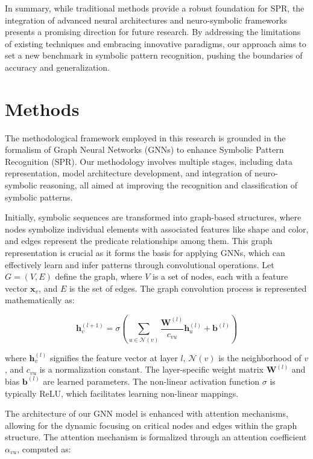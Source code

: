 \documentclass{article}
\begin{document}
In summary, while traditional methods provide a robust foundation for SPR, the integration of advanced neural architectures and neuro-symbolic frameworks presents a promising direction for future research. By addressing the limitations of existing techniques and embracing innovative paradigms, our approach aims to set a new benchmark in symbolic pattern recognition, pushing the boundaries of accuracy and generalization.

\section{Methods}
The methodological framework employed in this research is grounded in the formalism of Graph Neural Networks (GNNs) to enhance Symbolic Pattern Recognition (SPR). Our methodology involves multiple stages, including data representation, model architecture development, and integration of neuro-symbolic reasoning, all aimed at improving the recognition and classification of symbolic patterns. 

Initially, symbolic sequences are transformed into graph-based structures, where nodes symbolize individual elements with associated features like shape and color, and edges represent the predicate relationships among them. This graph representation is crucial as it forms the basis for applying GNNs, which can effectively learn and infer patterns through convolutional operations. Let \( G = (V, E) \) define the graph, where \( V \) is a set of nodes, each with a feature vector \( \mathbf{x}_v \), and \( E \) is the set of edges. The graph convolution process is represented mathematically as:

\[
\mathbf{h}_v^{(l+1)} = \sigma \left(\sum_{u \in \mathcal{N}(v)} \frac{\mathbf{W}^{(l)}}{c_{vu}} \mathbf{h}_u^{(l)} + \mathbf{b}^{(l)} \right)
\]

where \( \mathbf{h}_v^{(l)} \) signifies the feature vector at layer \( l \), \( \mathcal{N}(v) \) is the neighborhood of \( v \), and \( c_{vu} \) is a normalization constant. The layer-specific weight matrix \( \mathbf{W}^{(l)} \) and bias \( \mathbf{b}^{(l)} \) are learned parameters. The non-linear activation function \( \sigma \) is typically ReLU, which facilitates learning non-linear mappings.

The architecture of our GNN model is enhanced with attention mechanisms, allowing for the dynamic focusing on critical nodes and edges within the graph structure. The attention mechanism is formalized through an attention coefficient \( \alpha_{vu} \), computed as:
\end{document}
